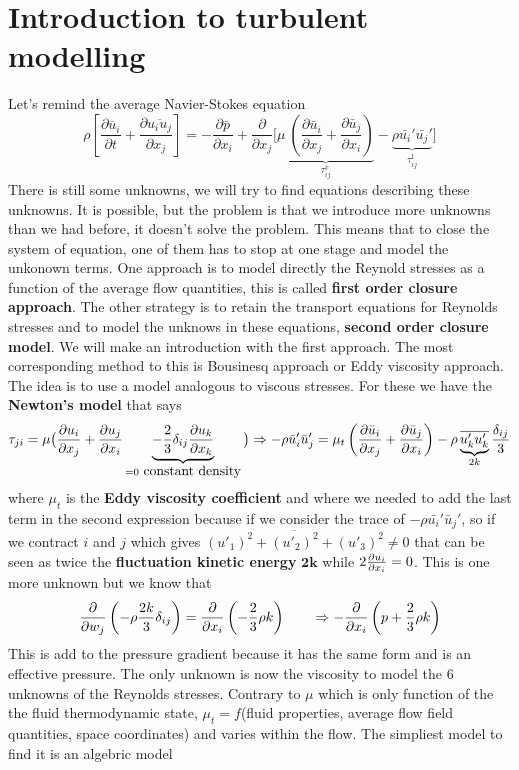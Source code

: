 \section{Introduction to turbulent modelling}
	Let's remind the average Navier-Stokes equation 
	\begin{equation}
		\rho \left[ \frac{\partial \bar{u}_i}{\partial t} + \frac{\partial \overline{u_i u_j}}{\partial x_j} \right] = - \frac{\partial \bar{p}}{\partial x_i} + \frac{\partial }{\partial x_j} \Big[ \underbrace{\mu \ \left( \frac{\partial \bar{u}_i}{\partial x_j} + \frac{\partial \bar{u}_j}{\partial x_i} \right)}_{\tau^v_{ij}} - \underbrace{\rho \bar{u_i}' \bar{u_j}'}_{\tau_{ij}^t} \Big]
	\end{equation}
	There is still some unknowns, we will try to find equations describing these unknowns. It is possible, but the problem is that we introduce more unknowns than we had before, it doesn't solve the problem. This means that to close the system of equation, one of them has to stop at one stage and model the unkonown terms. One approach is to model directly the Reynold stresses as a function of the average flow quantities, this is called \textbf{first order closure approach}.  The other strategy is to retain the transport equations  for Reynolds stresses and to model the unknows in these equations, \textbf{second order closure model}. We will make an introduction with the first approach. The most corresponding method to this is Bousinesq approach or Eddy viscosity approach. The idea is to use a model analogous to viscous stresses. For these we have the \textbf{Newton's model} that says 
	\begin{equation}
		\tau _{ji} = \mu\big( \frac{\partial u_i}{\partial x_j} + \frac{\partial u_j}{\partial x_i}  \underbrace{- \frac{2}{3}\delta _{ij}\frac{\partial u_k}{\partial x_k}}_{=0 \mbox{ constant density}} \big) 
		\Rightarrow  - \rho \bar{u}_i' \bar{u}_j' = \mu_t \left( \frac{\partial \bar{u}_i}{\partial x_j} + \frac{\partial \bar{u}_j}{\partial x_i} \right) - \rho \underbrace{\overline{u'_k u'_k}}_{2k} \frac{\delta _{ij}}{3}  
		\label{eq:4.55}
	\end{equation}
	where $\mu _t$ is the \textbf{Eddy viscosity coefficient} and where we needed to add the last term in the second expression because if we consider the trace of $- \rho \bar{u_i}' \bar{u}_j'$, so if we contract $i$ and $j$ which gives $\overline{(u'_1)^2 + (u'_2)^2 + (u'_3)^2} \neq 0$ that can be seen as twice the \textbf{fluctuation kinetic energy} $\mathbf{2k}$ while $2\frac{\partial u_i}{\partial x_i} = 0$. This is one more unknown but we know that 
	\begin{equation}
		\frac{\partial }{\partial w_j} \left(-\rho \frac{2k}{3}\delta _{ij} \right) = \frac{\partial}{\partial x_i}\left(- \frac{2}{3} \rho k\right) \qquad \Rightarrow - \frac{\partial}{\partial x_i}\left( p  +\frac{2}{3} \rho k \right)
	\end{equation}
	This is add to the pressure gradient because it has the same form and is an effective pressure. The only unknown is now the viscosity to model the 6 unknowns of the Reynolds stresses. Contrary to $\mu$ which is only function of the the fluid thermodynamic state, $\mu_t = f$(fluid properties, average flow field quantities, space coordinates) and varies within the flow. The simpliest model to find it is an algebric model 
	
